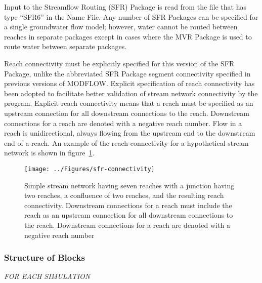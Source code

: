 Input to the Streamflow Routing (SFR) Package is read from the file that has type ``SFR6'' in the Name File. Any number of SFR Packages can be specified for a single groundwater flow model; however, water cannot be routed between reaches in separate packages except in cases where the MVR Package is used to route water between separate packages.

Reach connectivity must be explicitly specified for this version of the SFR Package, unlike the abbreviated SFR Package segment connectivity specified in previous versions of MODFLOW. Explicit specification of reach connectivity has been adopted to facilitate better validation of stream network connectivity by the program. Explicit reach connectivity means that a reach must be specified as an upstream connection for all downstream connections to the reach. Downstream connections for a reach are denoted with a negative reach number. Flow in a reach is unidirectional, always flowing from the upstream end to the downstream end of a reach. An example of the reach connectivity for a hypothetical stream network is shown in figure~\ref{fig:sfr-connectivity}.

\begin{figure}[ht]
	\centering
	\texttt{[image: ../Figures/sfr-connectivity]}
	\caption[Illustration of a simple stream network having seven reaches with a junction having two reaches, a confluence of two reaches, and the resulting reach connectivity]{Simple stream network having seven reaches with a junction having two reaches, a confluence of two reaches, and the resulting reach connectivity. Downstream connections for a reach must include the reach as an upstream connection for all downstream connections to the reach. Downstream connections for a  reach are denoted with a negative reach number}
	\label{fig:sfr-connectivity}
\end{figure}


\vspace{5mm}
\subsubsection{Structure of Blocks}

\vspace{5mm}
\noindent \textit{FOR EACH SIMULATION}




